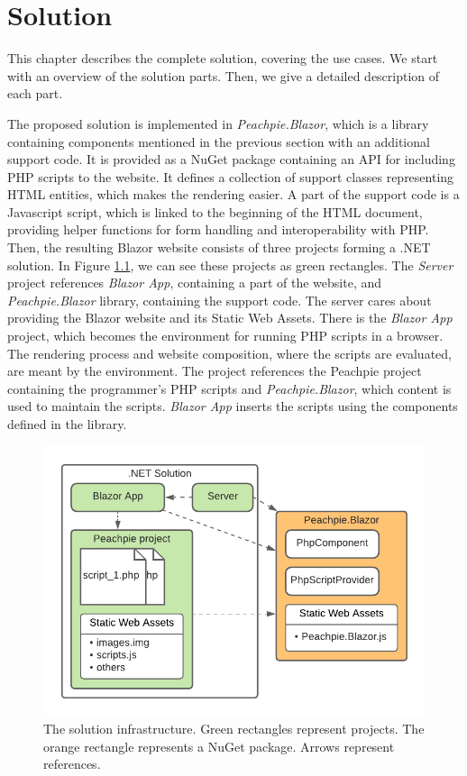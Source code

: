 \chapter{Solution}

This chapter describes the complete solution, covering the use cases.
We start with an overview of the solution parts.
Then, we give a detailed description of each part.
\par
The proposed solution is implemented in \textit{Peachpie.Blazor}, which is a library containing components mentioned in the previous section with an additional support code.
It is provided as a NuGet package containing an API for including PHP scripts to the website.
It defines a collection of support classes representing HTML entities, which makes the rendering easier.
A part of the support code is a Javascript script, which is linked to the beginning of the HTML document, providing helper functions for form handling and interoperability with PHP.
Then, the resulting Blazor website consists of three projects forming a .NET solution.
In Figure \ref{img13:infrastructure}, we can see these projects as green rectangles.
The \textit{Server} project references \textit{Blazor App}, containing a part of the website, and \textit{Peachpie.Blazor} library, containing the support code.
The server cares about providing the Blazor website and its Static Web Assets.
There is the \textit{Blazor App} project, which becomes the environment for running PHP scripts in a browser.
The rendering process and website composition, where the scripts are evaluated, are meant by the environment.
The project references the Peachpie project containing the programmer's PHP scripts and \textit{Peachpie.Blazor}, which content is used to maintain the scripts.
\textit{Blazor App} inserts the scripts using the components defined in the library.
\par
\begin{figure}[!b]\centering
\includegraphics[scale=0.9]{./img/SolutionInfrastructure}
\caption{The solution infrastructure. Green rectangles represent projects. The orange rectangle represents a NuGet package. Arrows represent references.}
\label{img13:infrastructure}
\end{figure} 
